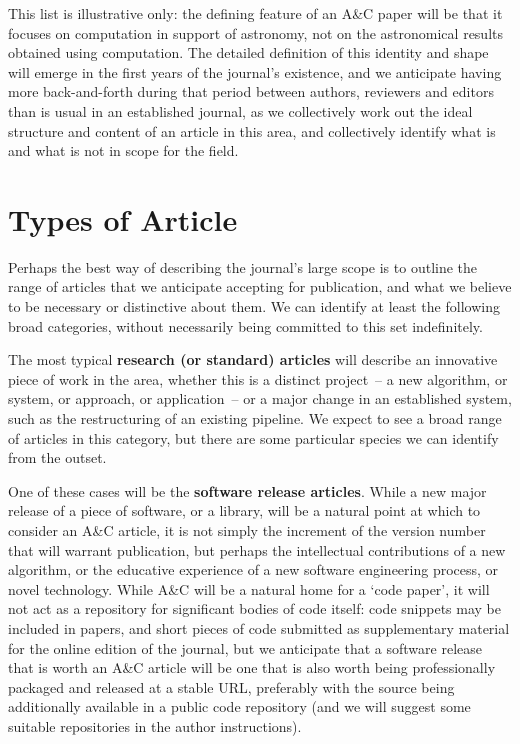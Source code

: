 This list is illustrative only: the defining feature of an A\&C paper will be that it focuses on computation in support of astronomy, not on the astronomical results obtained using computation. The detailed definition of this identity and shape will emerge in the first years of the journal's existence, and we anticipate having more back-and-forth during that period between authors, reviewers and editors than is usual in an established journal, as we collectively work out the ideal structure and content of an article in this area, and collectively identify what is and what is not in scope for the field.



\section{Types of Article}
\label{types}

Perhaps the best way of describing the journal's large scope is to outline the range of articles that we anticipate accepting for publication, and what we believe to be necessary or distinctive about them.  We can identify at least the following broad categories, without necessarily being committed to this set indefinitely.

The most typical \textbf{research (or standard) articles} will describe an innovative piece of work in the area, whether this is a distinct project~-- a new algorithm, or system, or approach, or application~-- or a major change in an established system, such as the restructuring of an existing pipeline.  We expect to see a broad range of articles in this category, but there are some particular species we can identify from the outset.

One of these cases will be the \textbf{software release articles}.   While a new major release of a piece of software, or a library, will be a natural point at which to consider an A\&C article, it is not simply the increment of the version number that will warrant publication, but perhaps the intellectual contributions of a new algorithm, or the educative experience of a new software engineering process, or novel technology. While A\&C will be a natural home for a `code paper', it will not act as a repository for significant bodies of code itself: code snippets may be included in papers, and short pieces of code submitted as supplementary material for the online edition of the journal, but  we anticipate that a software release that is worth an A\&C article will be one that is also worth being professionally packaged and released at a stable URL, preferably with the source being additionally available in a public code repository (and we will suggest some suitable repositories in the author instructions).  


